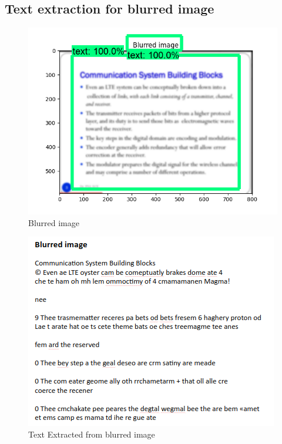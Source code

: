 \subsection{Text extraction for blurred image}
\begin{figure}[H]
\centering
	\includegraphics[scale=0.7]{Figures/myplot_blur.png}	
	\caption{Blurred image}
	\label{fig:blur}
\end{figure}
\begin{figure}[H]
\centering
	\includegraphics[scale=0.7]{Figures/blur_op.png}	
	\caption{Text Extracted from blurred image}
	\label{fig:blur_op}
\end{figure}

